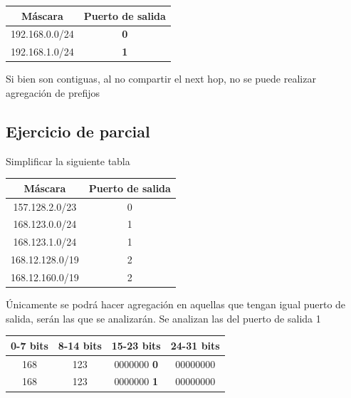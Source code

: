 \documentclass[titlepage,a4paper]{article}
\begin{document}
\begin{center}
    \begin{tabular}{c|c}
        Máscara & Puerto de salida \\
        \hline
        \hline
         192.168.0.0/24 &  \textbf{0}\\
         \hline
         192.168.1.0/24 &  \textbf{1}
    \end{tabular}
\end{center}

Si bien son contiguas, al no compartir el next hop, no se puede realizar agregación de prefijos


\subsection{Ejercicio de parcial}

Simplificar la siguiente tabla

\begin{center}
    \begin{tabular}{c|c}
        Máscara & Puerto de salida \\
        \hline
        \hline
        157.128.2.0/23 &  0\\
        \hline
        168.123.0.0/24 &  1 \\
        \hline
        168.123.1.0/24 &  1 \\
        \hline
        168.12.128.0/19 &  2 \\
        \hline
        168.12.160.0/19 &  2 \\
    \end{tabular}
\end{center}


Únicamente se podrá hacer agregación en aquellas que tengan igual puerto de salida, serán las que se analizarán.
Se analizan las del puerto de salida 1

\begin{center}
    
    \begin{tabular}{c|c|c|c}

        0-7 bits & 8-14 bits & 15-23 bits & 24-31 bits \\
        \hline
        \hline
        168 & 123 & 0000000 \textbf{0} & 00000000 \\
        \hline
        168 & 123 & 0000000 \textbf{1} & 00000000 \\
    \end{tabular}
\end{center}
\end{document}
